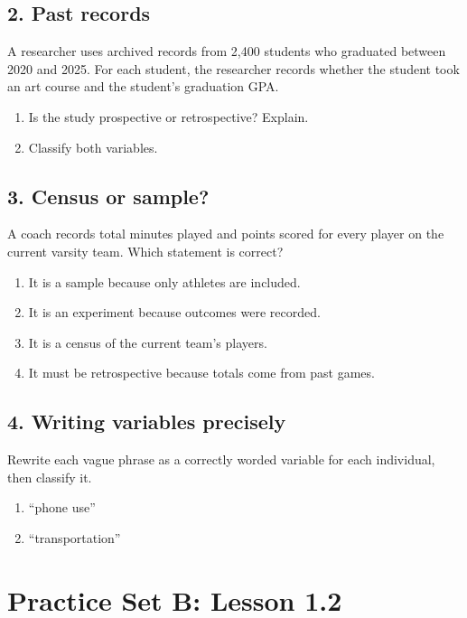 \documentclass[11pt]{article}
\newcommand{\workline}{\vspace{0.33in}\hrulefill}
\begin{document}
\subsection*{2. Past records}
A researcher uses archived records from 2,400 students who graduated between 2020 and 2025. For each student, the researcher records whether the student took an art course and the student's graduation GPA.
\begin{enumerate}[label=\alph*.]
  \item Is the study prospective or retrospective? Explain.\\[0.25in]
  \item Classify both variables.\\[0.25in]
\end{enumerate}

\subsection*{3. Census or sample?}
A coach records total minutes played and points scored for every player on the current varsity team. Which statement is correct?
\begin{enumerate}[label=\Alph*)]
  \item It is a sample because only athletes are included.
  \item It is an experiment because outcomes were recorded.
  \item It is a census of the current team's players.
  \item It must be retrospective because totals come from past games.
\end{enumerate}

\Needspace{1.75in}
\subsection*{4. Writing variables precisely}
Rewrite each vague phrase as a correctly worded variable for each individual, then classify it.
\begin{enumerate}[label=\alph*.]
  \item ``phone use'' \workline
  \item ``transportation'' \workline
\end{enumerate}

\Needspace{2.0in}
\section{Practice Set B: Lesson 1.2}
\end{document}
